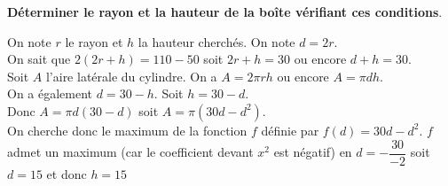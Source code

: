 \documentclass[12pt,a4paper]{article}  %
\begin{document}
\textbf{Déterminer le rayon et la hauteur de la boîte vérifiant ces conditions}.

\begin{corrBox}
    On note $r$ le rayon et $h$ la hauteur cherchés. On note $d=2 r$.\\
    On sait que $2(2 r+h)=110-50$ soit $2 r+h=30$ ou encore $d+h=30$.\\
    Soit $A$ l'aire latérale du cylindre. On a $A=2 \pi r h$ ou encore $A=\pi d h$.\\
    On a également $d=30-h$. Soit $h=30-d$.\\
    Donc $A=\pi d(30-d)$ soit $A=\pi\left(30 d-d^{2}\right)$.\\
    On cherche donc le maximum de la fonction $f$ définie par $f(d)=30 d-d^{2}$. $f$ admet un maximum (car le coefficient devant $x^{2}$ est négatif) en $d=-\dfrac{30}{-2}$ soit $d=15$ et donc $h=15$
\end{corrBox}
\end{document}
